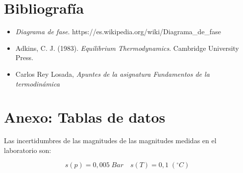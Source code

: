 \documentclass[a4paper,12pt,titlepage]{article}
\begin{document}
\section{Bibliografía}

\begin{itemize}
    \item \textit{Diagrama de fase}. https://es.wikipedia.org/wiki/Diagrama\_de\_fase
    \item Adkins, C. J. (1983). \textit{Equilibrium Thermodynamics}. Cambridge University Press.
    \item Carlos Rey Losada, \textit{Apuntes de la asignatura Fundamentos de la termodinámica}
\end{itemize}

\newpage

\section{Anexo: Tablas de datos}

Las incertidumbres de las magnitudes de las magnitudes medidas en el laboratorio son:

\begin{equation}
    s(p) = 0,005 \; Bar \quad s(T) = 0,1 \; (^{\circ}C) 
\end{equation}
\end{document}

